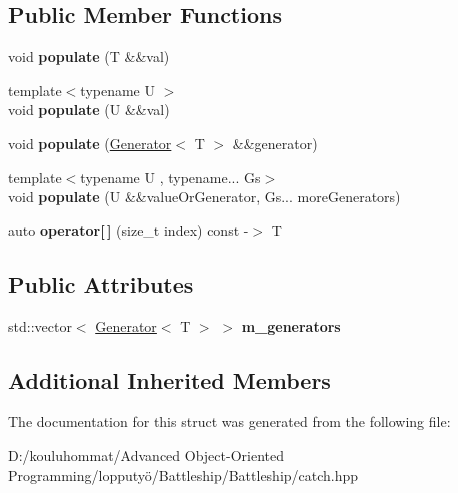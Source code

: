 \subsection*{Public Member Functions}
\begin{DoxyCompactItemize}
\item 
\mbox{\label{struct_catch_1_1_generators_1_1_generators_ad708036fa5a9bf0cd1520ce111bc851d}} 
void {\bfseries populate} (T \&\&val)
\item 
\mbox{\label{struct_catch_1_1_generators_1_1_generators_a8ff8b7dda734d1808b644fefc67f4c98}} 
{\footnotesize template$<$typename U $>$ }\\void {\bfseries populate} (U \&\&val)
\item 
\mbox{\label{struct_catch_1_1_generators_1_1_generators_a2155cad48ab03c362483e200d957eefc}} 
void {\bfseries populate} (\mbox{\hyperlink{class_catch_1_1_generators_1_1_generator}{Generator}}$<$ T $>$ \&\&generator)
\item 
\mbox{\label{struct_catch_1_1_generators_1_1_generators_a4b9680ee28e48e4dc4c4538b5510e649}} 
{\footnotesize template$<$typename U , typename... Gs$>$ }\\void {\bfseries populate} (U \&\&value\+Or\+Generator, Gs... more\+Generators)
\item 
\mbox{\label{struct_catch_1_1_generators_1_1_generators_a1812ebb7d0146d63e3a005e93831afa2}} 
auto {\bfseries operator\mbox{[}$\,$\mbox{]}} (size\+\_\+t index) const -\/$>$ T
\end{DoxyCompactItemize}
\subsection*{Public Attributes}
\begin{DoxyCompactItemize}
\item 
\mbox{\label{struct_catch_1_1_generators_1_1_generators_a49f1d0e8851a4726bb9981edffe094fa}} 
std\+::vector$<$ \mbox{\hyperlink{class_catch_1_1_generators_1_1_generator}{Generator}}$<$ T $>$ $>$ {\bfseries m\+\_\+generators}
\end{DoxyCompactItemize}
\subsection*{Additional Inherited Members}


The documentation for this struct was generated from the following file\+:\begin{DoxyCompactItemize}
\item 
D\+:/kouluhommat/\+Advanced Object-\/\+Oriented Programming/lopputyö/\+Battleship/\+Battleship/catch.\+hpp\end{DoxyCompactItemize}
